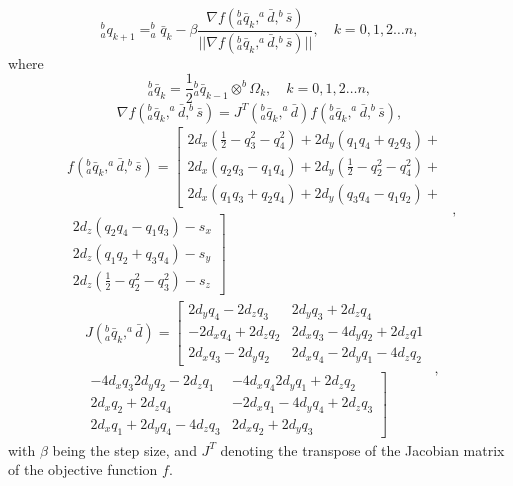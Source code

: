 \begin{equation}
\label{eq4_10}
^b_a q_{k+1} = ^b_a \bar{q}_k - \beta \frac{\nabla f(^b_a \bar{q}_k, ^a \bar{d}, ^b \bar{s})}{\vert \vert \nabla f(^b_a \bar{q}_k, ^a \bar{d}, ^b \bar{s}) \vert \vert}, \quad k = 0,1,2 \dots n,
\end{equation}
where
\begin{equation}
\label{eq4_10bis}
^b_a \bar{q}_k = \frac{1}{2} {^b_a \bar{q}_{k-1}} \otimes ^b{\Omega_k},  \quad k = 0,1,2 \dots n,
\end{equation}
\begin{equation}
\label{eq4_11}
\nabla f(^b_a \bar{q}_k, ^a \bar{d}, ^b \bar{s}) = J^T(^b_a \bar{q}_k,^a \bar{d}) f(^b_a \bar{q}_k, ^a \bar{d}, ^b \bar{s}),
\end{equation}
\begin{equation}
\label{eq4_12}
\begin{split}
f(^b_a \bar{q}_k, ^a \bar{d}, ^b \bar{s}) =
\left [ \begin{array}{c}
2d_x(\frac{1}{2} - q_3^2 - q_4^2) + 2d_y(q_1q_4 + q_2 q_3) + \\
2d_x(q_2 q_3 - q_1 q_4) + 2d_y(\frac{1}{2} - q_2^2 - q_4^2) + \\
2d_x(q_1 q_3 + q_2 q_4) + 2d_y(q_3 q_4 - q_1 q_2) + \end{array} \right. \\
\left. \begin{array}{r}
2 d_z(q_2q_4 - q_1q_3) - s_x \\
2d_z(q_1q_2 + q_3 q_4) - s_y \\
2d_z(\frac{1}{2} - q_2^2 - q_3^2) - s_z
\end{array} \right ] \end{split},
\end{equation}
\begin{equation}
\label{eq4_13}
\begin{split}
J(^b_a \bar{q}_k, ^a \bar{d}) =
\left [ \begin{array}{cc}
2d_yq_4 - 2d_zq_3 & 2d_yq_3+ 2d_zq_4\\
-2d_xq_4 + 2d_zq_2 & 2d_xq_3 - 4d_yq_2 + 2d_zq1 \\
2d_xq_3 - 2d_yq_2 & 2d_xq_4 - 2d_yq_1 - 4d_zq_2 \end{array} \right. \\
\left. \begin{array}{rr}
-4d_x q_3 2d_y q_2 - 2d_z q_1 & -4d_x q_4 2d_y q_1 + 2d_z q_2\\
2d_x q_2 + 2d_z q_4 &  -2d_x q_1 - 4d_y q_4 + 2d_z q_3\\
2d_x q_1 + 2 d_y q_4 - 4 d_z q_3 & 2 d_x q_2 + 2d_y q_3
\end{array} \right ] \end{split},
\end{equation}
with $\beta$ being the step size, and $J^T$ denoting the transpose of the Jacobian matrix of the objective function $f$.

